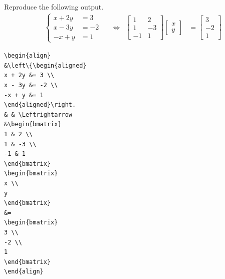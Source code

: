 \begin{exercisebox}
\begin{Exercise}
Reproduce the following output.
\begin{align}
&\left\{\begin{aligned}
x + 2y &= 3 \\
x - 3y &= -2 \\
-x + y &= 1
\end{aligned}\right.
& & \Leftrightarrow
&\begin{bmatrix}
1 & 2 \\
1 & -3 \\
-1 & 1
\end{bmatrix}
\begin{bmatrix}
x \\
y
\end{bmatrix}
&=
\begin{bmatrix}
3 \\
-2 \\
1
\end{bmatrix}
\end{align}
\end{Exercise}
\end{exercisebox}
\begin{Answer}
\begin{lstlisting}
\begin{align}
&\left\{\begin{aligned}
x + 2y &= 3 \\
x - 3y &= -2 \\
-x + y &= 1
\end{aligned}\right.
& & \Leftrightarrow
&\begin{bmatrix}
1 & 2 \\
1 & -3 \\
-1 & 1
\end{bmatrix}
\begin{bmatrix}
x \\
y
\end{bmatrix}
&=
\begin{bmatrix}
3 \\
-2 \\
1
\end{bmatrix}
\end{align}
\end{lstlisting}   
\end{Answer}